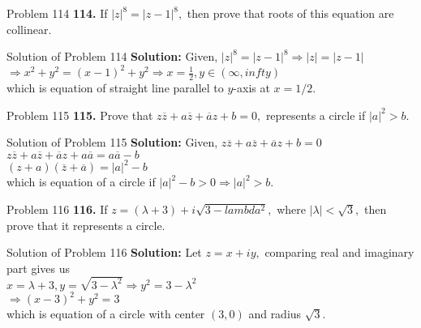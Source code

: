 \documentclass[aspectratio=169,8pt]{beamer}
\begin{document}
\begin{frame}{Problem 114}
  \textbf{114.} If $|z|^8 = |z - 1|^8,$ then prove that roots of this equation are collinear.
\end{frame}
\begin{frame}{Solution of Problem 114}
  \textbf{Solution:} Given, $|z|^8 = |z - 1|^8 \Rightarrow |z| = |z - 1|$\\
  \vspace*{0.2cm}
  $\Rightarrow x^2 + y^2 = (x - 1)^2 + y^2 \Rightarrow x = \frac{1}{2}, y\in(\infty, infty)$\\
  \vspace*{0.2cm}
  which is equation of straight line parallel to $y$-axis at $x = 1/2.$
\end{frame}
\begin{frame}{Problem 115}
  \textbf{115.} Prove that $z\overline{z} + a\overline{z} + \overline{a}z + b = 0,$ represents a circle if $|a|^2 > b.$
\end{frame}
\begin{frame}{Solution of Problem 115}
  \textbf{Solution:} Given, $z\overline{z} + a\overline{z} + \overline{a}z + b = 0$\\
  \vspace*{0.2cm}
  $z\overline{z} + a\overline{z} + \overline{a}z + a\overline{a} = a\overline{a} - b$\\
  \vspace*{0.2cm}
  $(z + a)(\overline{z} + \overline{a}) = |a|^2 - b$\\
  \vspace*{0.2cm}
  which is equation of a circle if $|a|^2 - b > 0 \Rightarrow |a|^2 > b.$
\end{frame}
\begin{frame}{Problem 116}
  \textbf{116.} If $z = (\lambda + 3) + i\sqrt{3 - lambda^2},$ where $|\lambda| < \sqrt{3},$ then prove that it represents a circle.
\end{frame}
\begin{frame}{Solution of Problem 116}
  \textbf{Solution:} Let $z = x + iy,$ comparing real and imaginary part gives us\\
  \vspace*{0.2cm}
  $x = \lambda + 3, y = \sqrt{3 - \lambda^2} \Rightarrow y^2 = 3 - \lambda^2$\\
  \vspace*{0.2cm}
  $\Rightarrow (x - 3)^2 + y^2 = 3$\\
  \vspace*{0.2cm}
  which is equation of a circle with center $(3, 0)$ and radius $\sqrt{3}.$
\end{frame}
\end{document}
